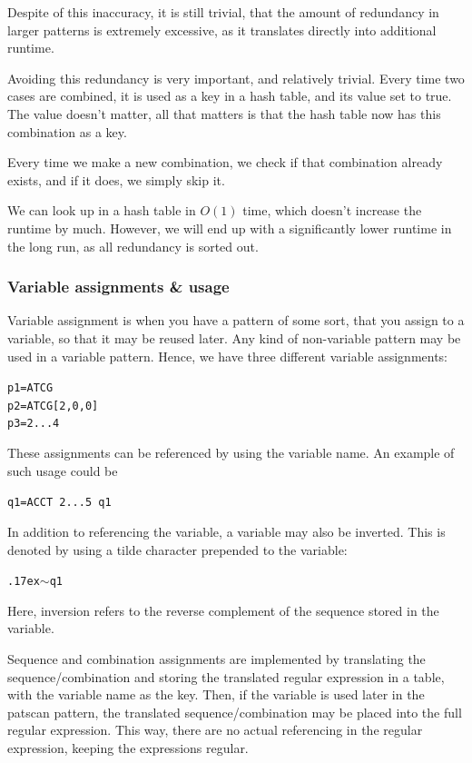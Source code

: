 \documentclass[12pt]{article}
\theoremstyle{definition}
\begin{document}
Despite of this inaccuracy, it is still trivial, that the amount of redundancy in larger patterns is extremely excessive, as it translates directly into additional runtime.

Avoiding this redundancy is very important, and relatively trivial. Every time two cases are combined, it is used as a key in a hash table, and its value set to true. The value doesn't matter, all that matters is that the hash table now has this combination as a key.

Every time we make a new combination, we check if that combination already exists, and if it does, we simply skip it.

We can look up in a hash table in $O(1)$ time, which doesn't increase the runtime by much. However, we will end up with a significantly lower runtime in the long run, as all redundancy is sorted out.

\subsubsection{Variable assignments \& usage}

Variable assignment is when you have a pattern of some sort, that you assign to a variable, so that it may be reused later. Any kind of non-variable pattern may be used in a variable pattern. Hence, we have three different variable assignments:

\texttt{p1=ATCG} \\
\texttt{p2=ATCG[2,0,0]} \\
\texttt{p3=2...4}

These assignments can be referenced by using the variable name. An example of such usage could be

\texttt{q1=ACCT 2...5 q1}

In addition to referencing the variable, a variable may also be inverted. This is denoted by using a tilde character prepended to the variable:

\texttt{{\raise.17ex\hbox{$\scriptstyle\mathtt{\sim}$}}q1}

Here, inversion refers to the reverse complement of the sequence stored in the variable.

Sequence and combination assignments are implemented by translating the sequence/combination and storing the translated regular expression in a table, with the variable name as the key. Then, if the variable is used later in the patscan pattern, the translated sequence/combination may be placed into the full regular expression. This way, there are no actual referencing in the regular expression, keeping the expressions regular.
\end{document}
